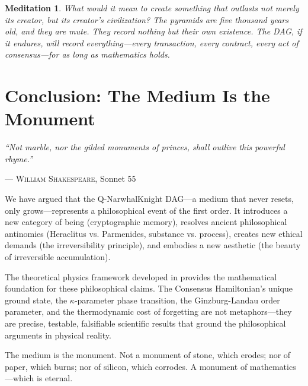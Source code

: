 \documentclass[12pt,a4paper]{article}
\theoremstyle{philosophical}
\newtheorem{meditation}{Meditation}
\begin{document}
\begin{meditation}
What would it mean to create something that outlasts not merely its creator, but its creator's civilization? The pyramids are five thousand years old, and they are mute. They record nothing but their own existence. The DAG, if it endures, will record everything---every transaction, every contract, every act of consensus---for as long as mathematics holds.
\end{meditation}

\section{Conclusion: The Medium Is the Monument}

\epigraph{\textit{``Not marble, nor the gilded monuments of princes, shall outlive this powerful rhyme.''}}{\textsc{--- William Shakespeare}, Sonnet 55}

We have argued that the Q-NarwhalKnight DAG---a medium that never resets, only grows---represents a philosophical event of the first order. It introduces a new category of being (cryptographic memory), resolves ancient philosophical antinomies (Heraclitus vs. Parmenides, substance vs. process), creates new ethical demands (the irreversibility principle), and embodies a new aesthetic (the beauty of irreversible accumulation).

The theoretical physics framework developed in \cite{qnk-physics,qnk-full} provides the mathematical foundation for these philosophical claims. The Consensus Hamiltonian's unique ground state, the $\kappa$-parameter phase transition, the Ginzburg-Landau order parameter, and the thermodynamic cost of forgetting are not metaphors---they are precise, testable, falsifiable scientific results that ground the philosophical arguments in physical reality.

The medium is the monument. Not a monument of stone, which erodes; nor of paper, which burns; nor of silicon, which corrodes. A monument of mathematics---which is eternal.

\vspace{1cm}
\begin{center}
\end{center}
\end{document}
